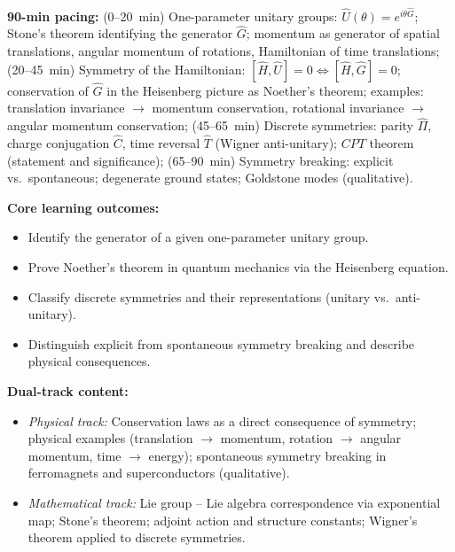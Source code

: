 \documentclass[11pt,a4paper]{article}
\begin{document}
\medskip
\begin{tcolorbox}[modulebox, title={Module~I.3 --- Lecture L04: Infinitesimal Generators, Symmetries, and Noether's Theorem}]
\textbf{90-min pacing:} (0--20~min) One-parameter unitary groups:
$\hat{U}(\theta)=e^{i\theta\hat{G}}$; Stone's theorem identifying the
generator $\hat{G}$; momentum as generator of spatial translations,
angular momentum of rotations, Hamiltonian of time translations;
(20--45~min) Symmetry of the Hamiltonian: $[\hat{H},\hat{U}]=0
\Leftrightarrow[\hat{H},\hat{G}]=0$; conservation of $\hat{G}$
in the Heisenberg picture as Noether's theorem;
examples: translation invariance $\to$ momentum conservation,
rotational invariance $\to$ angular momentum conservation;
(45--65~min) Discrete symmetries: parity $\hat{\Pi}$, charge conjugation $\hat{C}$,
time reversal $\hat{T}$ (Wigner anti-unitary); $CPT$ theorem (statement and significance);
(65--90~min) Symmetry breaking: explicit vs.\ spontaneous;
degenerate ground states; Goldstone modes (qualitative).

\medskip\textbf{Core learning outcomes:}
\begin{itemize}[leftmargin=1.4em,topsep=2pt,itemsep=1pt]
  \item Identify the generator of a given one-parameter unitary group.
  \item Prove Noether's theorem in quantum mechanics via the Heisenberg equation.
  \item Classify discrete symmetries and their representations (unitary vs.\ anti-unitary).
  \item Distinguish explicit from spontaneous symmetry breaking and describe physical consequences.
\end{itemize}

\medskip\textbf{Dual-track content:}
\begin{itemize}[leftmargin=1.4em,topsep=2pt,itemsep=1pt]
  \item \textit{Physical track:} Conservation laws as a direct consequence of symmetry;
    physical examples (translation $\to$ momentum, rotation $\to$ angular momentum,
    time $\to$ energy); spontaneous symmetry breaking in ferromagnets and superconductors (qualitative).
  \item \textit{Mathematical track:} Lie group -- Lie algebra correspondence via exponential map;
    Stone's theorem; adjoint action and structure constants;
    Wigner's theorem applied to discrete symmetries.
\end{itemize}


\end{tcolorbox}
\end{document}
